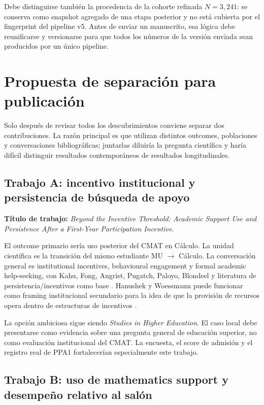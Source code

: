 \documentclass[11pt,letterpaper]{article}
\begin{document}
Debe distinguirse también la procedencia de la cohorte refinada $N=3,241$: se conserva como snapshot agregado de una etapa posterior y no está cubierta por el fingerprint del pipeline v5. Antes de enviar un manuscrito, esa lógica debe reunificarse y versionarse para que todos los números de la versión enviada sean producidos por un único pipeline.

\section{Propuesta de separación para publicación}

Solo después de revisar todos los descubrimientos conviene separar dos contribuciones. La razón principal es que utilizan distintos outcomes, poblaciones y conversaciones bibliográficas; juntarlas diluiría la pregunta científica y haría difícil distinguir resultados contemporáneos de resultados longitudinales.

\subsection{Trabajo A: incentivo institucional y persistencia de búsqueda de apoyo}

\textbf{Título de trabajo:} \emph{Beyond the Incentive Threshold: Academic Support Use and Persistence After a First-Year Participation Incentive}.

El outcome primario sería uso posterior del CMAT en Cálculo. La unidad científica es la transición del mismo estudiante MU $\rightarrow$ Cálculo. La conversación general es institutional incentives, behavioural engagement y formal academic help-seeking, con Kahu, Fong, Angrist, Pugatch, Paloyo, Blondeel y literatura de persistencia/incentivos como base \citep{kahu2013,kahuNelson2018,fong2023,angrist2009,pugatch2018,paloyo2016,blondeel2024}. Hanushek y Woessmann puede funcionar como framing institucional secundario para la idea de que la provisión de recursos opera dentro de estructuras de incentivos \citep{hanushek2008}.

La opción ambiciosa sigue siendo \emph{Studies in Higher Education}. El caso local debe presentarse como evidencia sobre una pregunta general de educación superior, no como evaluación institucional del CMAT. La encuesta, el score de admisión y el registro real de PPA1 fortalecerían especialmente este trabajo.

\subsection{Trabajo B: uso de mathematics support y desempeño relativo al salón}
\end{document}

